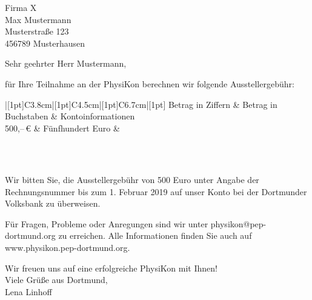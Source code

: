\documentclass[
  pepbrief,
  fontsize=12pt,
  paper=a4,
  DIV=14,
  parskip=half,
  backaddress=false,
]{scrlttr2}
\author{Lena Linhoff}
\begin{document}
\begin{letter}{%
  Firma X\\
  Max Mustermann\\
  Musterstraße 123\\
  456789 Musterhausen
}
\opening{Sehr geehrter Herr Mustermann,}
für Ihre Teilnahme an der PhysiKon berechnen wir folgende Ausstellergebühr:

\renewcommand{\arraystretch}{1.2}
\begin{center}
  \bfseries\scshape
	\begin{tabu}{|[1pt]C{3.8cm}|[1pt]C{4.5cm}|[1pt]C{6.7cm}|[1pt]}
		\tabucline[1pt]{-}
		 Betrag in Ziffern	&	Betrag in Buchstaben & Kontoinformationen\\
		\tabucline[1pt]{-}
    500,–\,€ & \normalfont Fünfhundert Euro & \normalfont \begin{tabular}{@{}c@{}}\end{tabular}\\
		\tabucline[1pt]{-}
	\end{tabu}
\end{center}
Wir bitten Sie, die Ausstellergebühr von 500 Euro unter Angabe der Rechnungsnummer  bis zum 1. Februar 2019 auf unser Konto bei der Dortmunder Volksbank zu überweisen.

Für Fragen, Probleme oder Anregungen sind wir unter physikon@pep-dortmund.org zu erreichen. Alle Informationen finden Sie auch auf www.physikon.pep-dortmund.org.

Wir freuen uns auf eine erfolgreiche PhysiKon mit Ihnen!\\

Viele Grüße aus Dortmund,\\


Lena Linhoff

\end{letter}
\end{document}
